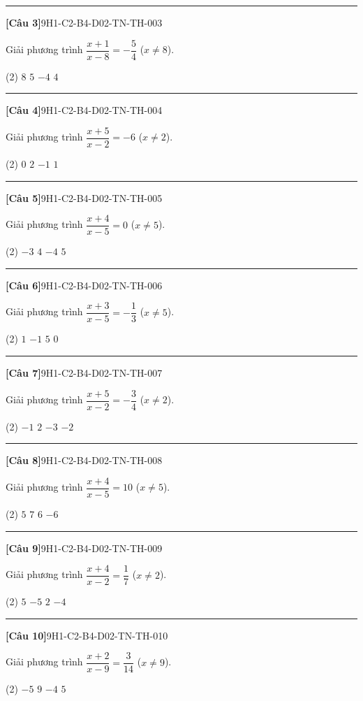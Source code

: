 \documentclass[12pt,a4paper]{article}
\newif\ifloigiai
\newenvironment{cauhoi}[2]{%
  \par\medskip\noindent\rule{\textwidth}{0.4pt}\par\nopagebreak
  \noindent\textbf{[#1]}\hfill{\scriptsize\ttfamily #2}\par\nopagebreak\smallskip}{\par}
\newcommand{\dapan}[1]{\ifloigiai\par\smallskip\noindent\textit{Đáp án:} \textbf{#1}\par\fi}
\begin{document}
\begin{cauhoi}{Câu 3}{9H1-C2-B4-D02-TN-TH-003}
Giải phương trình $\dfrac{x+1}{x-8}=-\dfrac{5}{4}$ ($x\ne 8$).
\begin{tasks}(2)
\task $8$
\task $5$
\task $-4$
\task $4$
\end{tasks}
\dapan{D}
\end{cauhoi}
\begin{cauhoi}{Câu 4}{9H1-C2-B4-D02-TN-TH-004}
Giải phương trình $\dfrac{x+5}{x-2}=-6$ ($x\ne 2$).
\begin{tasks}(2)
\task $0$
\task $2$
\task $-1$
\task $1$
\end{tasks}
\dapan{D}
\end{cauhoi}
\begin{cauhoi}{Câu 5}{9H1-C2-B4-D02-TN-TH-005}
Giải phương trình $\dfrac{x+4}{x-5}=0$ ($x\ne 5$).
\begin{tasks}(2)
\task $-3$
\task $4$
\task $-4$
\task $5$
\end{tasks}
\dapan{C}
\end{cauhoi}
\begin{cauhoi}{Câu 6}{9H1-C2-B4-D02-TN-TH-006}
Giải phương trình $\dfrac{x+3}{x-5}=-\dfrac{1}{3}$ ($x\ne 5$).
\begin{tasks}(2)
\task $1$
\task $-1$
\task $5$
\task $0$
\end{tasks}
\dapan{B}
\end{cauhoi}
\begin{cauhoi}{Câu 7}{9H1-C2-B4-D02-TN-TH-007}
Giải phương trình $\dfrac{x+5}{x-2}=-\dfrac{3}{4}$ ($x\ne 2$).
\begin{tasks}(2)
\task $-1$
\task $2$
\task $-3$
\task $-2$
\end{tasks}
\dapan{D}
\end{cauhoi}
\begin{cauhoi}{Câu 8}{9H1-C2-B4-D02-TN-TH-008}
Giải phương trình $\dfrac{x+4}{x-5}=10$ ($x\ne 5$).
\begin{tasks}(2)
\task $5$
\task $7$
\task $6$
\task $-6$
\end{tasks}
\dapan{C}
\end{cauhoi}
\begin{cauhoi}{Câu 9}{9H1-C2-B4-D02-TN-TH-009}
Giải phương trình $\dfrac{x+4}{x-2}=\dfrac{1}{7}$ ($x\ne 2$).
\begin{tasks}(2)
\task $5$
\task $-5$
\task $2$
\task $-4$
\end{tasks}
\dapan{B}
\end{cauhoi}
\begin{cauhoi}{Câu 10}{9H1-C2-B4-D02-TN-TH-010}
Giải phương trình $\dfrac{x+2}{x-9}=\dfrac{3}{14}$ ($x\ne 9$).
\begin{tasks}(2)
\task $-5$
\task $9$
\task $-4$
\task $5$
\end{tasks}
\dapan{A}
\end{cauhoi}
\end{document}
